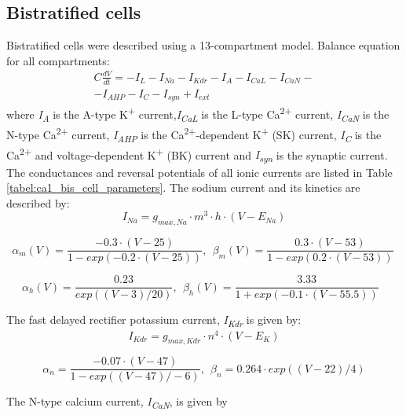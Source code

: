 \documentclass[a4paper,12pt]{article}
\begin{document}
\subsection{Bistratified cells}
Bistratified cells were described using a 13-compartment model. Balance equation for all compartments:
\begin{eqnarray}
C\frac{dV}{dt}=-I_L-I_{Na}-I_{Kdr}-I_A-I_{CaL}-I_{CaN} - \nonumber \\ -I_{AHP}-I_C-I_{syn}+I_{ext}
\end{eqnarray}
where \textit{I}\textit{\textsubscript{A}} is the A-type K\textsuperscript{+} current,\textit{I\textsubscript{CaL}}
is the L-type Ca\textsuperscript{2+} current, \textit{I}\textit{\textsubscript{CaN}} is the N-type
Ca\textsuperscript{2+} current, \textit{I}\textit{\textsubscript{AHP}} is the Ca\textsuperscript{2+}-dependent
K\textsuperscript{+} (SK) current, \textit{I}\textit{\textsubscript{C}} is the Ca\textsuperscript{2+} and
voltage-dependent K\textsuperscript{+} (BK) current and \textit{I}\textit{\textsubscript{syn}} is the synaptic current.
The conductances and reversal potentials of all ionic currents are listed in Table \ref{tabel:ca1_bis_cell_parameters}.
The sodium current and its kinetics are described by:
\begin{equation}
I_{Na}=g_{max, Na} \cdot m^3 \cdot h \cdot (V-E_{Na})
\end{equation}

\begin{equation}
\alpha_m(V)=\frac{-0.3\cdot(V-25)}{1-exp(-0.2\cdot(V-25))}, \ \  \beta_m(V)=\frac{0.3\cdot(V-53)}{1-exp(0.2\cdot(V-53))} \ 
\end{equation}

\begin{equation}
\alpha_h(V)=\frac{0.23}{exp((V-3)/20)}, \ \  \beta_h(V)=\frac{3.33}{1+exp(-0.1\cdot(V-55.5))}\ \ \ 
\end{equation}

The fast delayed rectifier potassium current, \textit{I\textsubscript{Kdr}} is given by:
\begin{equation}
I_{Kdr} = g_{max, Kdr} \cdot n^4 \cdot (V-E_K)
\end{equation}

\begin{equation}
\alpha_{n}=\frac{-0.07\cdot(V-47)}{1-exp((V-47)/-6)}, \ \  \beta_{n}=0.264\cdot exp((V-22)/4)
\end{equation}

The N-type calcium current, \textit{I}\textit{\textsubscript{CaN}}, is given by
\end{document}
